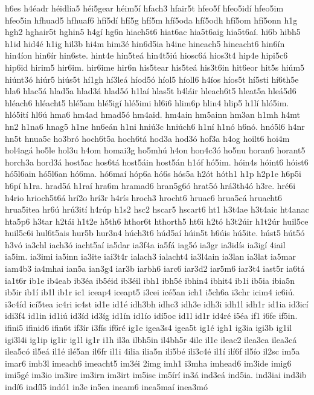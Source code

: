 {h6es
h4éadr
héidlia5
héi5gear
héim5í
hfach3
hfair5t
hfeo5f
hfeo5idí
hfeo5im
hfeo5in
hfhuad5
hfhuaf6
hfí5dí
hfí5g
hfí5m
hfí5oda
hfí5odh
hfí5om
hfí5onn
h1g
hgh2
hghair5t
hghin5
h4gí
hg6n
hiach5t6
hiat6ac
hia5t6aig
hia5t6aí.
hi6b
hibh5
h1id
hid4é
h1ig
hil3b
hi4m
him3é
hin6d5ia
h4ine
hineach5
hineacht6
hin6ín
hin4íon
hin6ír
hin6ste.
hint4e
hin5teá
hin4t5iú
hiosc6á
hios3t4
hip4e
hipi5c6
hip6id
hirim5
hir6im.
hir6ime
hir6n
his5tear
his5teá
his3t6in
hit6eor
hit5s
hiúm5
hiúnt3ó
hiúr5
hiús5t
hí1gh
hí3leá
híod5ó
híol5
híoll6
h4íos
híos5t
hí5sti
hí6th5e
hla6
hlac5á
hlad5a
hlad3á
hlad5ó
h1laí
hlas5t
h4láir
hleach6t5
hleat5a
hleá5d6
hléach6
hléacht5
hlé5am
hlé5igí
hlé5imi
hl6i6
hlim6p
hlin4
hlip5
h1lí
hló5im.
hló5ití
hl6ú
hma6
hm4ad
hmad5ó
hm4aid.
hm4ain
hm5ainn
hm3an
h1mh
h4mt
hn2
h1na6
hnag5
h1ne
hn6eán
h1ni
hniú3c
hniúch6
h1ní
h1nó
h6nó.
hnó5l6
h4nr
hn5t
hnua5c
ho3bró
hoch6t5a
hoch6tá
hod3a
hod3ó
hof3a
h4og
hoilt6
hoi4m
hol4agá
ho5le
hol3u
h4om
homai3g
ho5mhú
h4on
hon4c3ó
ho5nu
horan6
horant5
horch3a
hord3á
host5ac
hos6tá
host5áin
host5án
h1óf
hó5im.
hóin4s
hóint6
hóist6
hó5l6ain
hó5l6an
hó6ma.
hó6maí
hóp6a
hó6s
hós5a
h2ót
hóth1
h1p
h2p1e
h6p5i
h6pí
h1ra.
hrad5á
h1raí
hra6m
hramad6
hran5g6ó
hrat5ó
hrá3th4ó
h3re.
hré6i
h4rio
hrioch5t6á
hrí2o
hrí3r
h4rís
hroch3
hrocht6
hruac6
hrua5cá
hruacht6
hrua5itea
hr6ú
hrú3ití
h4rúp
h1s2
hsc2
hscar5
hscart6
ht1
h3t4ae
h3t4aic
ht4anac
hta5p6
h3tar
h2tái
h1t2e
h5th6
hthor6t
hthorth5
ht6i
h2tó
h3t2úir
h1t2úr
huil5ce
huil5c6i
hul6t5ais
hur5b
hur3n4
húch3t6
húd5aí
húin5t
h6úis
hú5ite.
húst5
hút5ó
h3vó
ia3chl
iach3ó
iacht5aí
ia5dar
ia3f4a
ia5fá
iag5ó
ia3gr
ia3idís
ia3igí
4iail
ia5im.
ia3imi
ia5inn
ia3ite
iai3t4r
ialach3
ialacht4
ia3l4ain
ia3lan
ia3lat
ia5mar
iam4b3
ia4mhai
ian5a
ian3g4
iar3b
iarbh6
iarc6
iar3d2
iar5m6
iar3t4
iast5r
ia6tá
ia1t6r
ib1e
ib4eab
ib3éa
ib5éid
ib3éil
ibh1
ibh5é
ibhin4
ibhit4
ib1i
ib5ia
ibia5n
ib5ir
ib1í
ib1l
ib1r
ic1
iceap4
iceapt5
i3cei
icé5an
ich1
i5ch6a
i3chr
icim4
ic6iú.
i3c4íd
icí5tea
ic4ri
ic4st
id1e
id1é
idh3bh
idhc3
idh3e
idh3i
idh1l
idh1r
id1ia
id3icí
idi3f4
id1in
id1iú
id3íd
id3íg
id1ín
id1ío
idí5oc
id1l
id1r
id4ré
i5éa
if1
i6fe
if5in.
ifini5
ifinid6
ifin6t
if3ír
i3fís
if6ré
ig1e
igea3s4
igea5t
ig1é
igh1
ig3ia
igi3b
ig1il
igi3l4i
ig1ip
ig1ir
ig1l
ig1r
i1h
il3a
ilbh5in
il4bh5r
4ilc
il1e
ileac2
ilea3ca
ilea3cá
ilea5có
il5eá
il1é
ilé5an
il6fr
il1i
4ilia
ilia5n
ili5bé
ili3c4é
il1í
ilí6f
il5ío
il2sc
im5a
imar6
imb3l
imeach6
imeacht5
im3éi
2img
imh1
i3mha
imhead6
im3ide
imig6
imi5gé
im3io
im3ire
im3irn
im3irt
im5isc
im5írí
in3á
ind3eá
ind5ia.
ind3iai
ind3ib
indí6
indíl5
indó1
in3e
in5ea
ineam6
inea5maí
inea3mó
}
